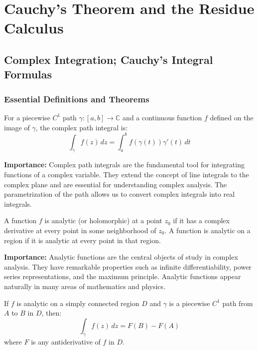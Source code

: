 \chapter{Cauchy's Theorem and the Residue Calculus}
\section{Complex Integration; Cauchy's Integral Formulas}

\subsection*{Essential Definitions and Theorems}

\begin{definition}
For a piecewise $C^1$ path $\gamma: [a,b] \to \mathbb{C}$ and a continuous function $f$ defined on the image of $\gamma$, the complex path integral is:
\[\int_\gamma f(z) \, dz = \int_a^b f(\gamma(t)) \gamma'(t) \, dt\]
\end{definition}

\noindent\textbf{Importance:} Complex path integrals are the fundamental tool for integrating functions of a complex variable. They extend the concept of line integrals to the complex plane and are essential for understanding complex analysis. The parametrization of the path allows us to convert complex integrals into real integrals.



\begin{definition}
A function $f$ is analytic (or holomorphic) at a point $z_0$ if it has a complex derivative at every point in some neighborhood of $z_0$. A function is analytic on a region if it is analytic at every point in that region.
\end{definition}

\noindent\textbf{Importance:} Analytic functions are the central objects of study in complex analysis. They have remarkable properties such as infinite differentiability, power series representations, and the maximum principle. Analytic functions appear naturally in many areas of mathematics and physics.



\begin{theorem}
If $f$ is analytic on a simply connected region $D$ and $\gamma$ is a piecewise $C^1$ path from $A$ to $B$ in $D$, then:
\[\int_\gamma f(z) \, dz = F(B) - F(A)\]
where $F$ is any antiderivative of $f$ in $D$.
\end{theorem}

